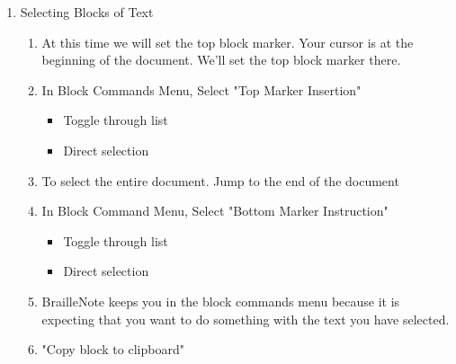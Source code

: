 \documentclass[10pt,letterpaper,twoside]{report}
\begin{document}
{\begin{enumerate}
\begin{enumerate}
\begin{itemize}
			            \item Bottom marker insertion: this is the bottom of your block of text, where you want the block (highlighted text) to end.
			            \item Erase file and exit keyword: erase the file and exit word processing.
			            \item Zap: this will erase any block markers you have set.
			            \item Grade: change the braille grade of the block of text.
		            \end{itemize}
		      \item Selecting Blocks of Text
		            \begin{enumerate}
			            \item At this time we will set the top block marker. Your cursor is at the beginning of the document. We'll set the top block marker there.
			            \item In Block Commands Menu, Select "Top Marker Insertion"
			                  \begin{itemize}
				                  \item Toggle through list 
				                  \item Direct selection 
			                  \end{itemize}
			            \item To select the entire document. Jump to the end of the document 
			            \item In Block Command Menu, Select "Bottom Marker Instruction"
			                  \begin{itemize}
				                  \item Toggle through list 
				                  \item Direct selection 
			                  \end{itemize}
			            \item BrailleNote keeps you in the block commands menu because it is expecting that you want to do something with the text you have selected.
			            \item "Copy block to clipboard"
			                  \begin{itemize}

\end{itemize}
\end{enumerate}
\end{enumerate}
\end{enumerate}}
\end{document}
